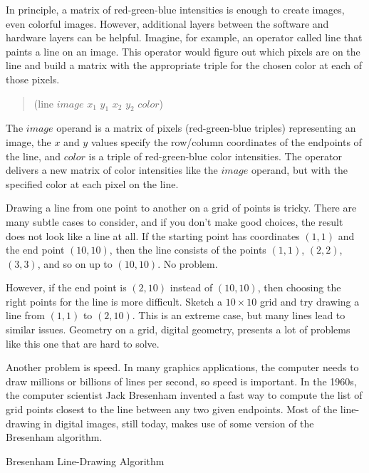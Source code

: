 In principle, a matrix of red-green-blue 
intensities is
enough to create images, even colorful images.
However, additional layers between the software and hardware
layers can be helpful. Imagine, for example, an operator called \textsf{line}
that paints a line on an image. This operator would figure out 
which pixels are on the line and build a matrix with
the appropriate triple for the chosen color at each of those pixels.
\begin{quote}
    \textsf{(line} $image$ $x_1$ $y_1$ $x_2$ $y_2$ $color$\textsf{)}
\end{quote}
The $image$ operand is a matrix of pixels (red-green-blue triples)
representing an image, the $x$ and $y$ values 
specify the row/column coordinates of the endpoints of the line, 
and $color$ is a triple of red-green-blue color intensities.
The operator delivers a new matrix of color intensities
like the $image$ operand, but with the specified color 
at each pixel on the line.

\begin{aside}
Drawing a line from one point to another on a grid of points is tricky. 
There are many subtle cases to consider, and
if you don't make good choices, the result does not look
like a line at all. If the starting point has 
coordinates $(1,1)$ and the end point $(10,10)$,
then the line consists of the points $(1,1)$,
$(2,2)$, $(3,3)$, and so on up to $(10,10)$. 
No problem. 

However, if the end point is $(2,10)$ instead of $(10,10)$,
then choosing the right points for the line is more difficult. 
Sketch a $10\times10$ grid and try drawing a line 
from  $(1,1)$ to  $(2,10)$. 
This is an extreme case, but many lines lead to similar issues. 
Geometry on a grid, 
digital geometry,
presents a lot of problems like this one that are hard to solve.

Another problem is speed. In many graphics applications, the
computer needs to draw millions or billions of lines per second,
so speed is important.
In the 1960s, the computer scientist 
Jack Bresenham invented 
a fast way to compute the list of grid points closest to the line
between any two given endpoints.
Most of the line-drawing in digital images, still today,
makes use of some version of the Bresenham algorithm.
\caption{Bresenham Line-Drawing Algorithm}
\label{aside:Bresenham}
\end{aside}

